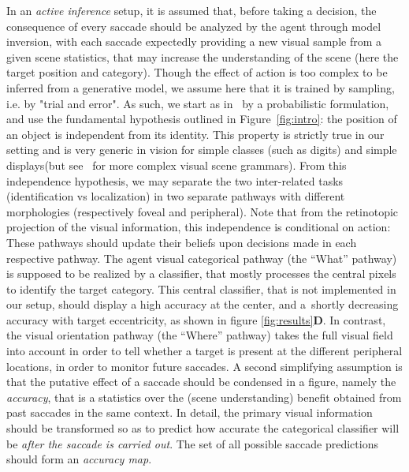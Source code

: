 \CNS
In an \emph{active inference} setup, it is assumed that, before taking a decision, the consequence of every saccade should be analyzed by the agent through model inversion,  with each saccade expectedly providing a new visual sample from a given scene statistics, that may increase the understanding of the scene (here the target position and category). Though the effect of action is too complex to be inferred from a generative model, we assume here that it is trained by sampling, i.e. by "trial and error". 
As such, we start as in~\citep{Friston12} by a probabilistic formulation, and use the fundamental hypothesis outlined in Figure~\ref{fig:intro}: the position of an object is independent from its identity. This property is strictly true in our setting and is very generic in vision for simple classes (such as digits) and simple displays\CNS (but see~\citep{Vo12} for more complex visual scene grammars)\fi . From this independence hypothesis, we may separate the two inter-related tasks (identification vs localization) in two separate pathways with different morphologies (respectively foveal and peripheral). Note that from the retinotopic projection of the visual information, this independence is conditional on action: These pathways should update their beliefs upon decisions made in each respective pathway.
The agent visual categorical pathway (the ``What'' pathway) is supposed to be realized by a classifier, that mostly processes the central pixels to identify the target category. This central classifier, that is not implemented in our setup, should display a high accuracy at the center, and a shortly decreasing accuracy with target eccentricity, as shown in figure \ref{fig:results}{\bf D}.
In contrast, the visual orientation pathway (the ``Where'' pathway) takes the full visual field into account in order to tell whether a target is present at the different peripheral locations, in order to monitor future saccades. 
A second simplifying assumption is that the putative effect of a saccade should be condensed in a figure, namely the \emph{accuracy}, that is a statistics over the (scene understanding) benefit obtained from past saccades in the same context. In detail, the primary visual information should be transformed so as to predict how accurate the categorical classifier will be \emph{after the saccade is carried out}. The set of all possible saccade predictions should form an \emph{accuracy map}.
